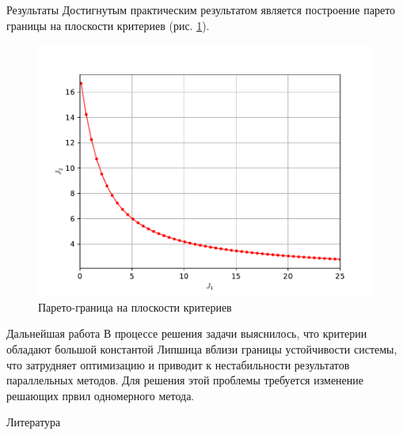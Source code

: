 \documentclass{beamer}
\begin{document}
\begin{frame}[t]
\begin{columns}[t]
\begin{column}[t]{0.48\paperwidth}
\begin{block}{Результаты}
            Достигнутым практическим результатом является построение парето границы на плоскости критериев (рис. \ref{fig:pareto}).
            \begin{figure}
                \label{fig:pareto}
                \centering
                \includegraphics[scale=1.2]{images/solution.pdf}
                \caption{Парето-граница на плоскости критериев}
            \end{figure}
          \end{block}
          \begin{block}{Дальнейшая работа}
            В процессе решения задачи выяснилось, что критерии обладают большой константой Липшица вблизи границы устойчивости системы, что затрудняет оптимизацию и
            приводит к нестабильности результатов параллельных методов. Для решения этой проблемы требуется изменение решающих првил одномерного метода.
          \end{block}
          \begin{block}{Литература}
            \printbibliography
          \end{block}
        \end{column}
    \end{columns}
\end{frame}
\end{document}
